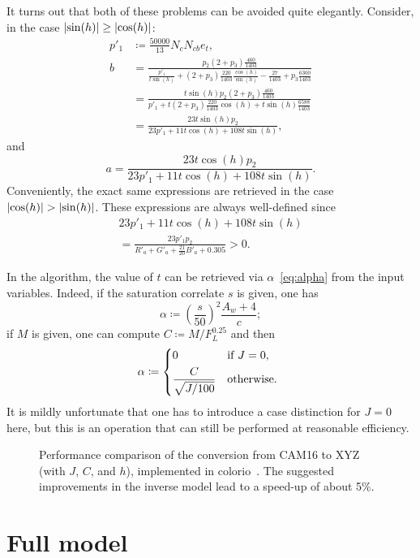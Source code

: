 \documentclass[twocolumn]{scrartcl}
\theoremstyle{named}
\DeclarePairedDelimiter\abs{\lvert}{\rvert}%
\begin{document}
It turns out that both of these problems can be avoided quite elegantly.
Consider, in the case $\abs{\sin(h)} \ge \abs{\cos(h)}$:
\begin{align*}
  p'_1 &\coloneqq \frac{50000}{13} N_c N_{cb} e_t,\\
  b &= \frac{p_2 (2+p_3) \frac{460}{1403}}{\frac{p'_1}{t\sin(h)} + (2+p_3) \frac{220}{1403} \frac{\cos(h)}{\sin(h)} - \frac{27}{1403} + p_3 \frac{6300}{1403}}\\
   &= \frac{t \sin(h) p_2 (2+p_3) \frac{460}{1403}}{p'_1 + t (2+p_3) \frac{220}{1403} \cos(h) + t \sin(h) \frac{6588}{1403}}\\
   &= \frac{23 t \sin(h) p_2}{23 p'_1 + 11 t \cos(h) + 108 t \sin(h)},
\end{align*}
and
\[
  a = \frac{23 t \cos(h) p_2}{23 p'_1 + 11 t \cos(h) + 108 t \sin(h)}.
\]
Conveniently, the exact same expressions are retrieved in the case
$\abs{\cos(h)} > \abs{\sin(h)}$. These expressions are always well-defined since
\begin{multline*}
  23 p'_1 + 11 t \cos(h) + 108 t \sin(h)\\
  = \frac{23 p'_1 p_2}{R'_a + G'_a + \tfrac{21}{20}B'_a + 0.305}
  > 0.
\end{multline*}

In the algorithm, the value of $t$ can be retrieved via
$\alpha$~\eqref{eq:alpha} from the input variables. Indeed, if the saturation
correlate $s$ is given, one has
\[
  \alpha \coloneqq {\left(\frac{s}{50}\right)}^2 \frac{A_w+4}{c};
\]
if $M$ is given, one can compute $C\coloneqq M / F_L^{0.25}$ and then
\[
\alpha\coloneqq\begin{dcases*}
  0 &if $J=0$,\\
  \frac{C}{\sqrt{J/100}}&otherwise.
\end{dcases*}
\]
It is mildly unfortunate that one has to introduce a case distinction for
$J=0$ here, but this is an operation that can still be performed at reasonable
efficiency.

\begin{figure}

  \caption{Performance comparison of the conversion from CAM16 to XYZ (with
  $J$, $C$, and $h$), implemented in colorio~\cite{colorio}. The suggested
  improvements in the inverse model lead to a speed-up of about 5\%.}
\end{figure}

\appendix
\section{Full model\label{sec:full}}
\end{document}
